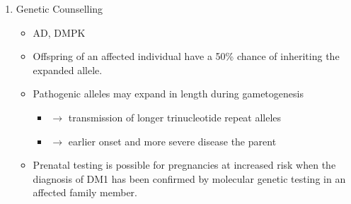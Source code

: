 \documentclass[12pt]{scrartcl}
\begin{document}
\begin{enumerate}
\item Genetic Counselling
\label{sec:org1165b08}
\begin{itemize}
\item AD, DMPK
\item Offspring of an affected individual have a 50\% chance of inheriting the expanded allele.
\item Pathogenic alleles may expand in length during gametogenesis
\begin{itemize}
\item \(\to\) transmission of longer trinucleotide repeat alleles
\item \(\to\) earlier onset and more severe disease the parent
\end{itemize}
\item Prenatal testing is possible for pregnancies at increased risk when
the diagnosis of DM1 has been confirmed by molecular genetic testing
in an affected family member.
\end{itemize}
\end{enumerate}
\end{document}
